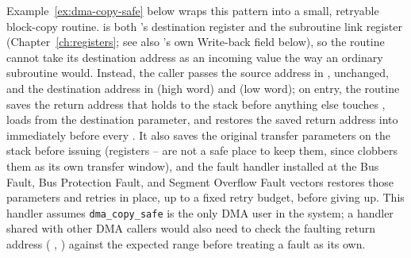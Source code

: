 Example~\ref{ex:dma-copy-safe} below wraps this pattern into a small, retryable block-copy routine.  is both
's destination register and the subroutine link register (Chapter~\ref{ch:registers}; see also
's own Write-back field below), so the routine cannot take its destination address as an incoming
 value the way an ordinary subroutine would. Instead, the caller passes the source address in ,
unchanged, and the destination address in  (high word) and  (low word); on entry, the routine saves the
return address that  holds to the stack before anything else touches , loads  from the destination
parameter, and restores the saved return address into  immediately before every . It also saves
the original transfer parameters on the stack before issuing  (registers -- are not a
safe place to keep them, since  clobbers them as its own transfer window), and the fault handler
installed at the Bus Fault, Bus Protection Fault, and Segment Overflow Fault vectors restores those parameters and
retries in place, up to a fixed retry budget, before giving up. This handler assumes \texttt{dma\_copy\_safe} is the
only DMA user in the system; a handler shared with other DMA callers would also need to check the faulting return
address ( , ) against the expected range before treating a fault as its own.


